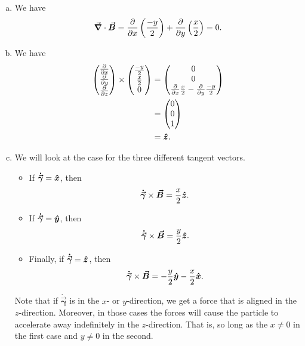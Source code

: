 \documentclass[12pt]{article} %
\newcommand{\tangentgamma}{\boldsymbol{\dot{\vec{\gamma}}}}
\newcommand{\vecfieldB}{\boldsymbol{\vec{B}}}
\begin{document}
\begin{solution}~
\begin{enumerate}[(a)]
	\item We have
\[
\grad \cdot \vecfieldB = \frac{\partial}{\partial x} \left(\frac{-y}{2}\right) + \frac{\partial}{\partial y} \left(\frac{x}{2} \right) = 0.
\]
    \item We have
    \begin{align*}
        \begin{pmatrix} \frac{\partial}{\partial x} \\ \frac{\partial}{\partial y} \\ \frac{\partial}{\partial z} \end{pmatrix} \times \begin{pmatrix} \frac{-y}{2} \\ \frac{x}{2} \\ 0 \end{pmatrix} &= \begin{pmatrix} 0 \\ 0 \\   \frac{\partial}{\partial x} \frac{x}{2} - \frac{\partial}{\partial y} \frac{-y}{2} \end{pmatrix} \\
                &= \begin{pmatrix} 0 \\ 0 \\ 1 \end{pmatrix}\\
                &= \boldsymbol{\hat{z}}.
    \end{align*}
    \item We will look at the case for the three different tangent vectors.
    \begin{itemize}
        \item If $\tangentgamma = \xhat$, then
        \[
        \tangentgamma \times \vecfieldB = \frac{x}{2}\zhat.
        \]
        \item If $\tangentgamma = \yhat$, then
        \[
        \tangentgamma \times \vecfieldB = \frac{y}{2} \zhat.
        \]
        \item Finally, if $\tangentgamma =\zhat$, then
        \[
        \tangentgamma \times \vecfieldB = -\frac{y}{2}\yhat -\frac{x}{2}\xhat.
        \]
    \end{itemize}
    Note that if $\tangentgamma$ is in the $x$- or $y$-direction, we get a force that is aligned in the $z$-direction. Moreover, in those cases the forces will cause the particle to accelerate away indefinitely in the $z$-direction. That is, so long as the $x\neq 0$ in the first case and $y\neq 0$ in the second.


\end{enumerate}
\end{solution}
\end{document}

